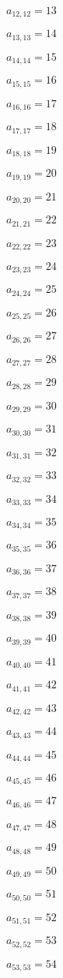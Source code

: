 \documentclass[a4paper,12pt]{article}
\begin{document}
$a _{ 12, 12 } = 13$

$a _{ 13, 13 } = 14$

$a _{ 14, 14 } = 15$

$a _{ 15, 15 } = 16$

$a _{ 16, 16 } = 17$

$a _{ 17, 17 } = 18$

$a _{ 18, 18 } = 19$

$a _{ 19, 19 } = 20$

$a _{ 20, 20 } = 21$

$a _{ 21, 21 } = 22$

$a _{ 22, 22 } = 23$

$a _{ 23, 23 } = 24$

$a _{ 24, 24 } = 25$

$a _{ 25, 25 } = 26$

$a _{ 26, 26 } = 27$

$a _{ 27, 27 } = 28$

$a _{ 28, 28 } = 29$

$a _{ 29, 29 } = 30$

$a _{ 30, 30 } = 31$

$a _{ 31, 31 } = 32$

$a _{ 32, 32 } = 33$

$a _{ 33, 33 } = 34$

$a _{ 34, 34 } = 35$

$a _{ 35, 35 } = 36$

$a _{ 36, 36 } = 37$

$a _{ 37, 37 } = 38$

$a _{ 38, 38 } = 39$

$a _{ 39, 39 } = 40$

$a _{ 40, 40 } = 41$

$a _{ 41, 41 } = 42$

$a _{ 42, 42 } = 43$

$a _{ 43, 43 } = 44$

$a _{ 44, 44 } = 45$

$a _{ 45, 45 } = 46$

$a _{ 46, 46 } = 47$

$a _{ 47, 47 } = 48$

$a _{ 48, 48 } = 49$

$a _{ 49, 49 } = 50$

$a _{ 50, 50 } = 51$

$a _{ 51, 51 } = 52$

$a _{ 52, 52 } = 53$

$a _{ 53, 53 } = 54$
\end{document}
